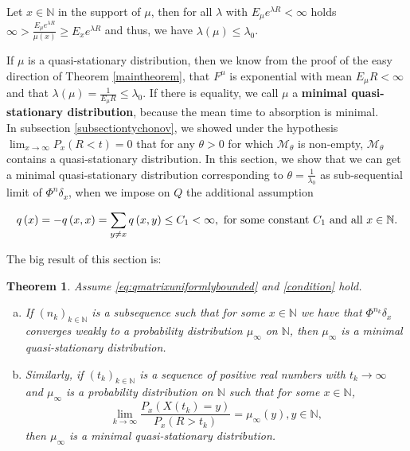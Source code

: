 \documentclass[12pt,a4paper]{scrartcl}
\newtheorem{theorem}{Theorem}[section]
\numberwithin{equation}{section}
\newcommand{\N}{\mathbb{N}} %
\begin{document}
Let $x \in \N$ in the support of $\mu$, then for all $\lambda$ with $E_{\mu} e^{\lambda R} < \infty$ holds $ \infty > \frac{E_{\mu} e^{\lambda R} }{\mu\left(x\right)} \geq E_x e^{\lambda R}$ and thus, we have $\lambda\left(\mu\right) \leq \lambda_0$.

If $\mu$ is a quasi-stationary distribution, then we know from the proof of the easy direction of Theorem \ref{maintheorem}, that $F^{\mu}$ is exponential with mean $E_{\mu} R < \infty$ and that $\lambda\left(\mu\right) = \frac{1}{E_{\mu} R} \leq \lambda_0.$ If there is equality, we call $\mu$ a \textbf{minimal quasi-stationary distribution}, because the mean time to absorption is minimal. \\[2ex]

In subsection \ref{subsectiontychonov}, we showed under the hypothesis $\lim_{x \to \infty} P_x\left(R < t\right) = 0$ that for any $\theta > 0$ for which $\mathcal{M}_{\theta}$ is non-empty, $\mathcal{M}_{\theta}$ contains a quasi-stationary distribution. In this section, we show that we can get a minimal quasi-stationary distribution corresponding to $\theta = \frac{1}{\lambda_0}$ as sub-sequential limit of $\Phi^n\delta_x$, when we impose on $Q$ the additional assumption

\begin{equation} \label{eq:qmatrixuniformlybounded}
q\left(x\right) = -q\left(x,x\right) = \sum_{y \neq x} q\left(x,y\right) \leq C_1 < \infty, \textnormal{ for some constant } C_1 \textnormal{ and all } x \in \N.
\end{equation}

The big result of this section is:
\begin{theorem} \label{maintheoremminimalqsd}
Assume \eqref{eq:qmatrixuniformlybounded} and \eqref{condition} hold.
\begin{enumerate} [(a)]
\item If $\left(n_k\right)_{k \in \N}$ is a subsequence such that for some $x \in \N$ we have that $\Phi^{n_k}\delta_x$ converges weakly to a probability distribution $\mu_{\infty}$ on $\N$, then $\mu_{\infty}$ is a minimal quasi-stationary distribution.
\item Similarly, if $\left(t_k\right)_{k \in \N}$ is a sequence of positive real numbers with $t_k \to \infty$ and $\mu_{\infty}$ is a probability distribution on $\N$ such that for some $x \in \N$,
\begin{equation} \label{eq:minimalqsdalongtk}
\lim_{k \to \infty} \frac{P_x\left(X\left(t_k\right) = y\right)}{P_x\left(R > t_k\right)} = \mu_{\infty}\left(y\right), y \in \N,
\end{equation}
then $\mu_{\infty}$ is a minimal quasi-stationary distribution.
\end{enumerate}
\end{theorem}
\end{document}
